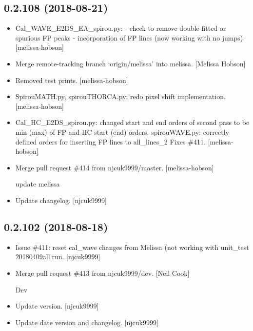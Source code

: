 \documentclass[a4paper,10pt,english]{report}
\begin{document}
\subsection{0.2.108 (2018-08-21)}
\label{\detokenize{misc/changelog:id358}}\begin{itemize}
\item {} 
Cal\_WAVE\_E2DS\_EA\_spirou.py: - check to remove double-fitted or
spurious FP peaks - incorporation of FP lines (now working with no
jumps) {[}melissa-hobson{]}

\item {} 
Merge remote-tracking branch ‘origin/melissa’ into melissa. {[}Melissa
Hobson{]}

\item {} 
Removed test prints. {[}melissa-hobson{]}

\item {} 
SpirouMATH.py, spirouTHORCA.py: redo pixel shift implementation.
{[}melissa-hobson{]}

\item {} 
Cal\_HC\_E2DS\_spirou.py: changed start and end orders of second pass to
be min (max) of FP and HC start (end) orders. spirouWAVE.py: correctly
defined orders for inserting FP lines to all\_lines\_2 Fixes \#411.
{[}melissa-hobson{]}

\item {} 
Merge pull request \#414 from njcuk9999/master. {[}melissa-hobson{]}

update melissa

\item {} 
Update changelog. {[}njcuk9999{]}

\end{itemize}


\subsection{0.2.102 (2018-08-18)}
\label{\detokenize{misc/changelog:id359}}\begin{itemize}
\item {} 
Issue \#411: reset cal\_wave changes from Melissa (not working with
unit\_test 20180409all.run. {[}njcuk9999{]}

\item {} 
Merge pull request \#413 from njcuk9999/dev. {[}Neil Cook{]}

Dev

\item {} 
Update version. {[}njcuk9999{]}

\item {} 
Update date version and changelog. {[}njcuk9999{]}

\end{itemize}
\end{document}
